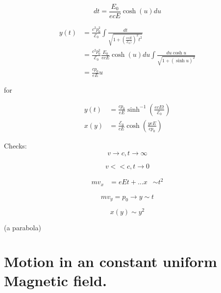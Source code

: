 \begin{equation}\label{eqn:relativisticElectrodynamicsT3:n}
dt = \frac{E_0}{ e c E} \cosh(u) du
\end{equation}

\begin{align*}
y(t) 
&= \frac{c^2 p_0^2}{\mathcal{E}_0} \int \frac{dt}{\sqrt{1 + (\frac{e c E}{\mathcal{E}_0)})^2 t^2 }} \\
&= \frac{c^2 p_0^2}{\mathcal{E}_0} 
\frac{E_0}{ e c E} \cosh(u) du
\int \frac{ du \cosh u }{\sqrt{1 + (\sinh u)^2 }} \\
&= \frac{c p_0}{ e E} u 
\end{align*}

for

\begin{equation}\label{eqn:relativisticElectrodynamicsT3:n}
\boxed{
\begin{aligned}
y(t) &= \frac{c p_0}{ e E} \sinh^{-1} \left( \frac{e c E t}{\mathcal{E}_0} \right) \\
x(y) &= \frac{\mathcal{E}_0}{c E} \cosh( \frac{y e E }{ c p_0} )
\end{aligned}
}
\end{equation}

Checks:
\begin{equation}\label{eqn:relativisticElectrodynamicsT3:n}
v \rightarrow c, t \rightarrow \infty
\end{equation}

\begin{equation}\label{eqn:relativisticElectrodynamicsT3:n}
v << c, t \rightarrow 0
\end{equation}

\begin{align*}
m v_x &= e E t + ...
x &\sim t^2 
\end{align*}

\begin{equation}\label{eqn:relativisticElectrodynamicsT3:n}
m v_y = p_0 \rightarrow y \sim t
\end{equation}

\begin{equation}\label{eqn:relativisticElectrodynamicsT3:n}
x(y) \sim y^2
\end{equation}

(a parabola)

\section{Motion in an constant uniform Magnetic field.}

